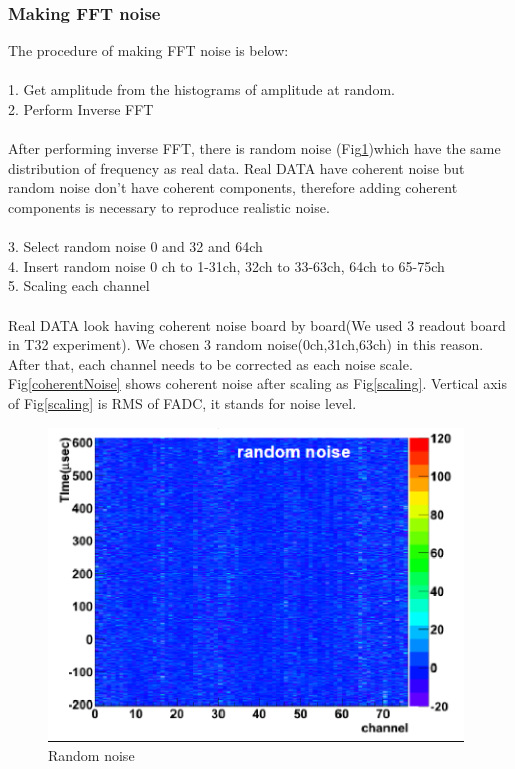 \subsubsection{Making FFT noise}
 The procedure of making FFT noise is below:\\
\\
1. Get amplitude from the histograms of amplitude at random.\\
2. Perform Inverse FFT\\
\\
After performing inverse FFT, there is random noise (Fig\ref{randomNoise})which have the same distribution of frequency as real data. Real DATA have coherent noise but random noise don't have coherent components, therefore adding coherent components is necessary to reproduce realistic noise.\\
\\
3. Select random noise 0 and 32 and 64ch\\
4. Insert random noise 0 ch to 1-31ch, 32ch to 33-63ch, 64ch to 65-75ch\\
5. Scaling each channel \\
\\
Real DATA look having coherent noise board by board(We used 3 readout board in T32 experiment). We chosen 3 random noise(0ch,31ch,63ch) in this reason. After that, each channel needs to be corrected as each noise scale. Fig\ref{coherentNoise} shows coherent noise after scaling as Fig\ref{scaling}. Vertical axis of Fig\ref{scaling} is RMS of FADC, it stands for noise level.\\
\begin{figure}[!htb]
  \centering
  \centering
  \includegraphics[width=11cm,clip]{./fig/randomnoise.eps}
  \caption{Random noise}
  \label{randomNoise}
\end{figure}
